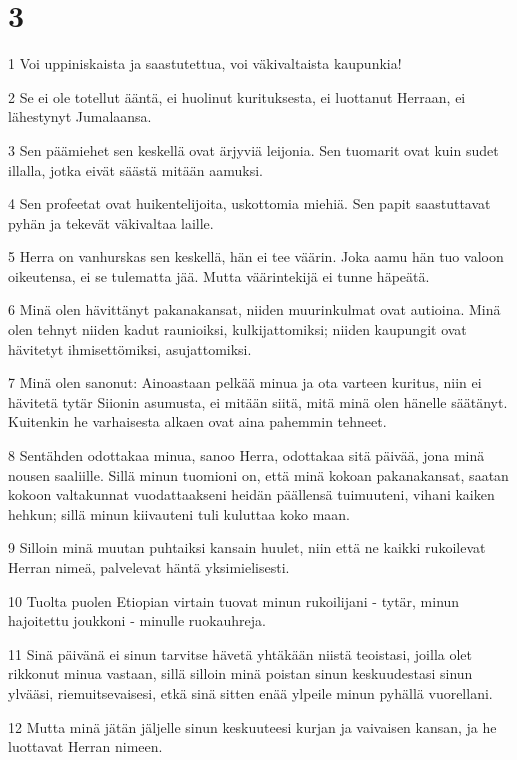 \chapter{3}

\par 1 Voi uppiniskaista ja saastutettua, voi väkivaltaista kaupunkia!
\par 2 Se ei ole totellut ääntä, ei huolinut kurituksesta, ei luottanut Herraan, ei lähestynyt Jumalaansa.
\par 3 Sen päämiehet sen keskellä ovat ärjyviä leijonia. Sen tuomarit ovat kuin sudet illalla, jotka eivät säästä mitään aamuksi.
\par 4 Sen profeetat ovat huikentelijoita, uskottomia miehiä. Sen papit saastuttavat pyhän ja tekevät väkivaltaa laille.
\par 5 Herra on vanhurskas sen keskellä, hän ei tee väärin. Joka aamu hän tuo valoon oikeutensa, ei se tulematta jää. Mutta väärintekijä ei tunne häpeätä.
\par 6 Minä olen hävittänyt pakanakansat, niiden muurinkulmat ovat autioina. Minä olen tehnyt niiden kadut raunioiksi, kulkijattomiksi; niiden kaupungit ovat hävitetyt ihmisettömiksi, asujattomiksi.
\par 7 Minä olen sanonut: Ainoastaan pelkää minua ja ota varteen kuritus, niin ei hävitetä tytär Siionin asumusta, ei mitään siitä, mitä minä olen hänelle säätänyt. Kuitenkin he varhaisesta alkaen ovat aina pahemmin tehneet.
\par 8 Sentähden odottakaa minua, sanoo Herra, odottakaa sitä päivää, jona minä nousen saaliille. Sillä minun tuomioni on, että minä kokoan pakanakansat, saatan kokoon valtakunnat vuodattaakseni heidän päällensä tuimuuteni, vihani kaiken hehkun; sillä minun kiivauteni tuli kuluttaa koko maan.
\par 9 Silloin minä muutan puhtaiksi kansain huulet, niin että ne kaikki rukoilevat Herran nimeä, palvelevat häntä yksimielisesti.
\par 10 Tuolta puolen Etiopian virtain tuovat minun rukoilijani - tytär, minun hajoitettu joukkoni - minulle ruokauhreja.
\par 11 Sinä päivänä ei sinun tarvitse hävetä yhtäkään niistä teoistasi, joilla olet rikkonut minua vastaan, sillä silloin minä poistan sinun keskuudestasi sinun ylvääsi, riemuitsevaisesi, etkä sinä sitten enää ylpeile minun pyhällä vuorellani.
\par 12 Mutta minä jätän jäljelle sinun keskuuteesi kurjan ja vaivaisen kansan, ja he luottavat Herran nimeen.
